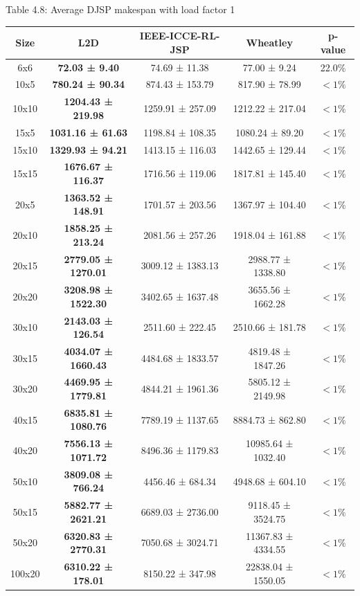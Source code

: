\begin{table}
    Table 4.8: Average DJSP makespan with load factor 1\\
    \vspace{1mm}
    \label{table:4.6}
    \footnotesize 
    \begin{tabular}{ccccc}
        \toprule
        Size & L2D & IEEE-ICCE-RL-JSP & Wheatley & p-value \\
        \midrule
        6x6 & \textbf{72.03 ± 9.40} & 74.69 ± 11.38 & 77.00 ± 9.24 & 22.0$\%$ \\
        10x5 & \textbf{780.24 ± 90.34} & 874.43 ± 153.79 & 817.90 ± 78.99 & $< 1\%$ \\
        10x10 & \textbf{1204.43 ± 219.98} & 1259.91 ± 257.09 & 1212.22 ± 217.04 & $< 1\%$ \\
        15x5 & \textbf{1031.16 ± 61.63} & 1198.84 ± 108.35 & 1080.24 ± 89.20 & $< 1\%$ \\
        15x10 & \textbf{1329.93 ± 94.21} & 1413.15 ± 116.03 & 1442.65 ± 129.44 & $< 1\%$ \\
        15x15 & \textbf{1676.67 ± 116.37} & 1716.56 ± 119.06 & 1817.81 ± 145.40 & $< 1\%$ \\
        20x5 & \textbf{1363.52 ± 148.91} & 1701.57 ± 203.56 & 1367.97 ± 104.40 & $< 1\%$ \\
        20x10 & \textbf{1858.25 ± 213.24} & 2081.56 ± 257.26 & 1918.04 ± 161.88 & $< 1\%$ \\
        20x15 & \textbf{2779.05 ± 1270.01} & 3009.12 ± 1383.13 & 2988.77 ± 1338.80 & $< 1\%$ \\
        20x20 & \textbf{3208.98 ± 1522.30} & 3402.65 ± 1637.48 & 3655.56 ± 1662.28 & $< 1\%$ \\
        30x10 & \textbf{2143.03 ± 126.54} & 2511.60 ± 222.45 & 2510.66 ± 181.78 & $< 1\%$ \\
        30x15 & \textbf{4034.07 ± 1660.43} & 4484.68 ± 1833.57 & 4819.48 ± 1847.26 & $< 1\%$ \\
        30x20 & \textbf{4469.95 ± 1779.81} & 4844.21 ± 1961.36 & 5805.12 ± 2149.98 & $< 1\%$ \\
        40x15 & \textbf{6835.81 ± 1080.76} & 7789.19 ± 1137.65 & 8884.73 ± 862.80 & $< 1\%$ \\
        40x20 & \textbf{7556.13 ± 1071.72} & 8496.36 ± 1179.83 & 10985.64 ± 1032.40 & $< 1\%$ \\
        50x10 & \textbf{3809.08 ± 766.24} & 4456.46 ± 684.34 & 4948.68 ± 604.10 & $< 1\%$ \\
        50x15 & \textbf{5882.77 ± 2621.21} & 6689.03 ± 2736.00 & 9118.45 ± 3524.75 & $< 1\%$ \\
        50x20 & \textbf{6320.83 ± 2770.31} & 7050.68 ± 3024.71 & 11367.83 ± 4334.55 & $< 1\%$ \\
        100x20 & \textbf{6310.22 ± 178.01} & 8150.22 ± 347.98 & 22838.04 ± 1550.05 & $< 1\%$ \\
        \bottomrule
    \end{tabular}
\end{table}
    
